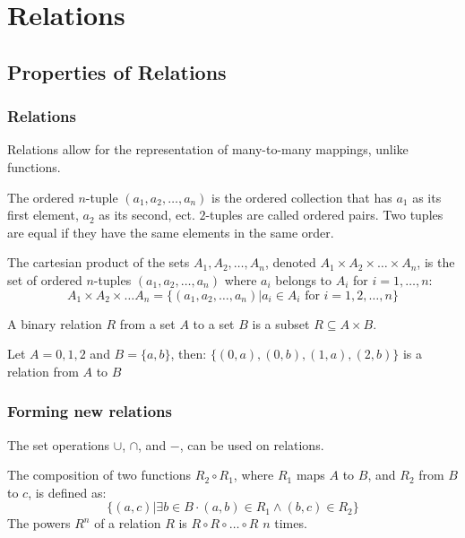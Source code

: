 \chapter{Relations}

\section{Properties of Relations}
\subsection{Relations}
Relations allow for the representation of many-to-many mappings, unlike functions.

The ordered \(n\)-tuple \((a_1, a_2, \dots, a_n)\) is the ordered collection that has \(a_1\) as its first element, \(a_2\) as its second, ect. \(2\)-tuples are called ordered pairs. Two tuples are equal if they have the same elements in the same order.

The cartesian product of the sets \(A_1, A_2, \dots, A_n\), denoted \(A_1 \times A_2 \times \dots \times A_n\), is the set of ordered \(n\)-tuples \((a_1, a_2, \dots, a_n)\) where \(a_i\) belongs to \(A_i\) for \(i = 1, \dots, n\):
\begin{equation*}
    A_1 \times A_2 \times \dots A_n = \{(a_1, a_2, \dots, a_n) | a_i \in A_i \text{ for } i = 1, 2, \dots, n\}
\end{equation*}

A binary relation \(R\) from a set \(A\) to a set \(B\) is a subset \(R \subseteq A \times B\).
\begin{example}
    Let \(A = {0, 1, 2}\) and \(B = \{a, b\}\), then:
    \(\{(0, a), (0, b), (1, a), (2, b)\}\) is a relation from \(A\) to \(B\)
\end{example}

\subsection{Forming new relations}
The set operations \(\cup\), \(\cap\), and \(-\), can be used on relations.

The composition of two functions \(R_2 \circ R_1\), where \(R_1\) maps \(A\) to \(B\), and \(R_2\) from \(B\) to \(c\), is defined as:
\begin{equation*}
    \{(a, c) | \exists b \in B\cdotp (a, b) \in R_1 \land (b, c) \in R_2\}
\end{equation*}
The powers \(R^n\) of a relation \(R\) is \(R \circ R \circ \dots \circ R\) \(n\) times.

